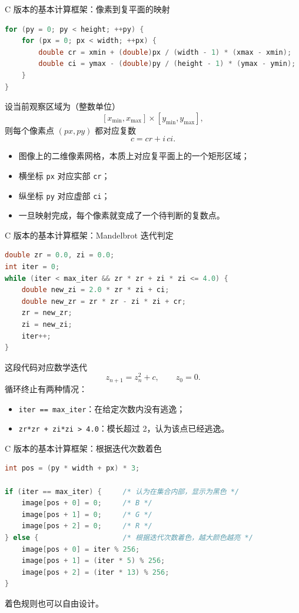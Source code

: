\documentclass[aspectratio=169,11pt]{ctexbeamer}
\begin{document}
\begin{frame}[fragile]{C 版本的基本计算框架：像素到复平面的映射}
\begin{lstlisting}[language=C]
for (py = 0; py < height; ++py) {
    for (px = 0; px < width; ++px) {
        double cr = xmin + (double)px / (width - 1) * (xmax - xmin);
        double ci = ymax - (double)py / (height - 1) * (ymax - ymin);
    }
}
\end{lstlisting}
设当前观察区域为（整数单位）
\[
[x_{\min}, x_{\max}] \times [y_{\min}, y_{\max}],
\]
则每个像素点 $(px, py)$ 都对应复数
\[
c = cr + i\,ci.
\]

\begin{itemize}
  \item 图像上的二维像素网格，本质上对应复平面上的一个矩形区域；
  \item 横坐标 \texttt{px} 对应实部 \texttt{cr}；
  \item 纵坐标 \texttt{py} 对应虚部 \texttt{ci}；
  \item 一旦映射完成，每个像素就变成了一个待判断的复数点。
\end{itemize}
\end{frame}

\begin{frame}[fragile]{C 版本的基本计算框架：Mandelbrot 迭代判定}
\begin{lstlisting}[language=C]
double zr = 0.0, zi = 0.0;
int iter = 0;
while (iter < max_iter && zr * zr + zi * zi <= 4.0) {
    double new_zi = 2.0 * zr * zi + ci;
    double new_zr = zr * zr - zi * zi + cr;
    zr = new_zr;
    zi = new_zi;
    iter++;
}
\end{lstlisting}
这段代码对应数学迭代
\[
z_{n+1} = z_n^2 + c, \qquad z_0 = 0.
\]
循环终止有两种情况：
\begin{itemize}
  \item \texttt{iter == max\_iter}：在给定次数内没有逃逸；
  \item \texttt{zr*zr + zi*zi > 4.0}：模长超过 2，认为该点已经逃逸。
\end{itemize}
\end{frame}

\begin{frame}[fragile]{C 版本的基本计算框架：根据迭代次数着色}
\begin{lstlisting}[language=C]
int pos = (py * width + px) * 3;

if (iter == max_iter) {     /* 认为在集合内部，显示为黑色 */
    image[pos + 0] = 0;     /* B */
    image[pos + 1] = 0;     /* G */
    image[pos + 2] = 0;     /* R */
} else {                    /* 根据迭代次数着色，越大颜色越亮 */
    image[pos + 0] = iter % 256;
    image[pos + 1] = (iter * 5) % 256;
    image[pos + 2] = (iter * 13) % 256;
}
\end{lstlisting}

着色规则也可以自由设计。

\end{frame}
\end{document}
